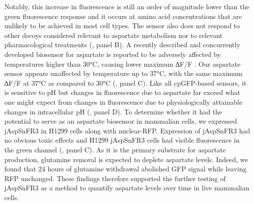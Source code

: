 \documentclass[9pt,lineno]{elife}
\begin{document}
Notably, this increase in fluorescence is still an order of magnitude lower than the green fluorescence response and it occurs at amino acid concentrations that are unlikely to be achieved in most cell types.
The sensor also does not respond to other decoys considered relevant to aspartate metabolism nor to relevant pharmacological treatments (, panel B).
A recently described and concurrently developed biosensor for aspartate is reported to be adversely affected by temperatures higher than 30°C, causing lower maximum ∆F/F \citep{Hellweg2023}.
Our aspartate sensor appears unaffected by temperature up to 37°C, with the same maximum ∆F/F at 37°C as compared to 30°C (, panel C).
Like all cpGFP-based sensors, it is sensitive to pH but changes in fluorescence due to aspartate far exceed what one might expect from changes in fluorescence due to physiologically attainable changes in intracellular pH (, panel D).
To determine whether it had the potential to serve as an aspartate biosensor in mammalian cells, we expressed jAspSnFR3 in H1299 cells along with nuclear-RFP.
Expression of jAspSnFR3 had no obvious toxic effects and H1299 jAspSnFR3 cells had visible fluorescence in the green channel (, panel C).
As it is the primary substrate for aspartate production, glutamine removal is expected to deplete aspartate levels.
Indeed, we found that 24 hours of glutamine withdrawal abolished GFP signal while leaving RFP unchanged.
These findings therefore supported the further testing of jAspSnFR3 as a method to quantify aspartate levels over time in live mammalian cells.
\end{document}
